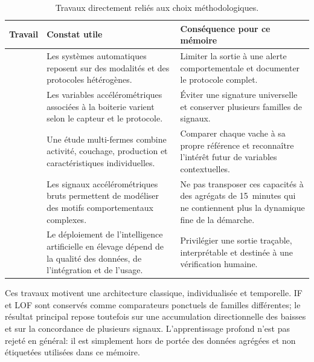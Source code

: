 \begin{table}[H]
    \centering
    \small
    \caption{Travaux directement reliés aux choix méthodologiques.}
    \label{tab:revue_ciblee}
    \begin{tabular}{>{\raggedright\arraybackslash}p{3.0cm}
                    >{\raggedright\arraybackslash}p{4.7cm}
                    >{\raggedright\arraybackslash}p{6.0cm}}
        \toprule
        \textbf{Travail} & \textbf{Constat utile} & \textbf{Conséquence pour ce mémoire} \\
        \midrule
        \citet{alsaaod2019automatic}
        & Les systèmes automatiques reposent sur des modalités et des protocoles hétérogènes.
        & Limiter la sortie à une alerte comportementale et documenter le protocole complet. \\
        \addlinespace
        \citet{oleary2020accelerometers}
        & Les variables accélérométriques associées à la boiterie varient selon le capteur et
          le protocole.
        & Éviter une signature universelle et conserver plusieurs familles de signaux. \\
        \addlinespace
        \citet{lavrova2023lameness}
        & Une étude multi-fermes combine activité, couchage, production et caractéristiques
          individuelles.
        & Comparer chaque vache à sa propre référence et reconnaître l'intérêt futur de
          variables contextuelles. \\
        \addlinespace
        \citet{balasso2023behaviour}
        & Les signaux accélérométriques bruts permettent de modéliser des motifs
          comportementaux complexes.
        & Ne pas transposer ces capacités à des agrégats de 15~minutes qui ne contiennent
          plus la dynamique fine de la démarche. \\
        \addlinespace
        \citet{palma2025scoping}
        & Le déploiement de l'intelligence artificielle en élevage dépend de la qualité des
          données, de l'intégration et de l'usage.
        & Privilégier une sortie traçable, interprétable et destinée à une vérification
          humaine. \\
        \bottomrule
    \end{tabular}
\end{table}

Ces travaux motivent une architecture classique, individualisée et temporelle. IF et LOF
sont conservés comme comparateurs ponctuels de familles différentes; le résultat principal
repose toutefois sur une accumulation directionnelle des baisses et sur la concordance de
plusieurs signaux. L'apprentissage profond n'est pas rejeté en général: il est simplement
hors de portée des données agrégées et non étiquetées utilisées dans ce mémoire.

